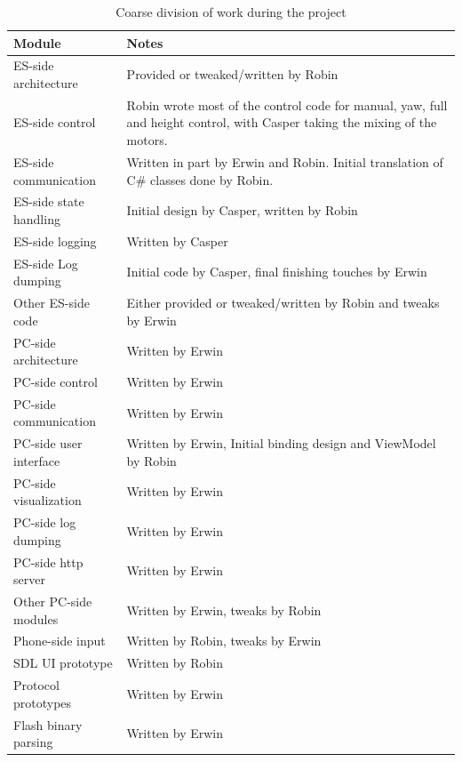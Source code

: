 \documentclass[final]{article}
\begin{document}
\begin{table}[H]
    \caption{Coarse division of work during the project}
    \label{tab:work-division}
    \centering
    \begin{tabular}{lp{12cm}}
    \toprule
    Module                   & Notes \\
    \midrule
    ES-side architecture & Provided or tweaked/written by Robin \\
    ES-side control & Robin wrote most of the control code for manual, yaw, full and height control, with Casper taking the mixing of the motors. \\
    ES-side communication & Written in part by Erwin and Robin. Initial translation of C\# classes done by Robin.\\
    ES-side state handling & Initial design by Casper, written by Robin \\
    ES-side logging & Written by Casper \\
    ES-side Log dumping & Initial code by Casper, final finishing touches by Erwin \\
    Other ES-side code & Either provided or tweaked/written by Robin and tweaks by Erwin \\
    \midrule
    PC-side architecture & Written by Erwin \\
    PC-side control & Written by Erwin \\
    PC-side communication & Written by Erwin \\
    PC-side user interface & Written by Erwin, Initial binding design and ViewModel by Robin \\
    PC-side visualization & Written by Erwin \\
    PC-side log dumping & Written by Erwin \\
    PC-side http server & Written by Erwin \\
    Other PC-side modules & Written by Erwin, tweaks by Robin \\
    \midrule
    Phone-side input & Written by Robin, tweaks by Erwin \\
    SDL UI prototype & Written by Robin \\
    Protocol prototypes & Written by Erwin \\
    Flash binary parsing & Written by Erwin \\
    \bottomrule
    \end{tabular}
\end{table}
\end{document}

